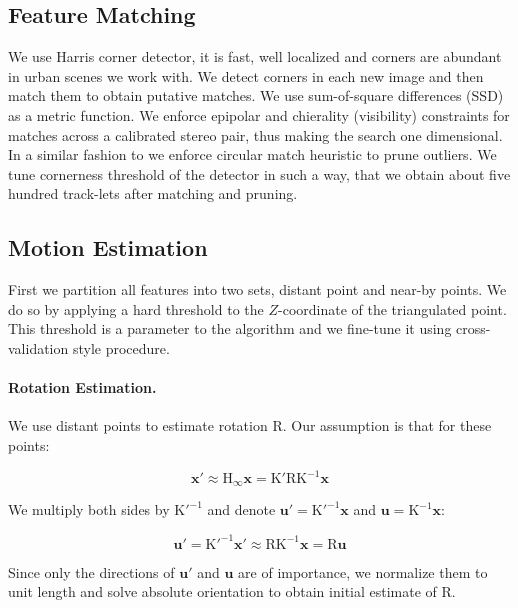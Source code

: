 \documentclass[runningheads]{llncs}
\begin{document}
\subsection{Feature Matching}
We use Harris corner detector, it is fast, well localized and corners
are abundant in urban scenes we work with. We detect corners in each
new image and then match them to obtain putative matches. We use
sum-of-square differences (SSD) as a metric function.  We enforce
epipolar and chierality (visibility) constraints for matches across a
calibrated stereo pair, thus making the search one dimensional. In a
similar fashion to \cite{Geiger2011} we enforce circular match
heuristic to prune outliers.  We tune cornerness threshold of the
detector in such a way, that we obtain about five hundred track-lets
after matching and pruning.

\subsection{Motion Estimation}
First we partition all features into two sets, distant point and
near-by points.  We do so by applying a hard threshold to the
$Z$-coordinate of the triangulated point.  This threshold is a
parameter to the algorithm and we fine-tune it using cross-validation
style procedure.

\paragraph{Rotation Estimation.} We use distant points to estimate
rotation $\mathrm{R}$. Our assumption is that for these points:

\begin{equation}
\mathbf{x}' \approx \mathrm{H}_\infty\mathbf{x} = \mathrm{K'RK^{-1}}\mathbf{x}
\end{equation}

We multiply both sides by $\mathrm{K'^{-1}}$ and denote $\mathbf{u'} = \mathrm{K'^{-1}}\mathbf{x}$ and $\mathbf{u} = \mathrm{K^{-1}}\mathbf{x}$:

\begin{equation}
\mathbf{u'} = \mathrm{K'^{-1}}\mathbf{x}' \approx \mathrm{RK^{-1}}\mathbf{x} = \mathrm{R}\mathbf{u}
\end{equation}

Since only the directions of $\mathbf{u'}$ and $\mathbf{u}$ are of
importance, we normalize them to unit length and solve absolute
orientation to obtain initial estimate of $\mathrm{R}$.
\end{document}
